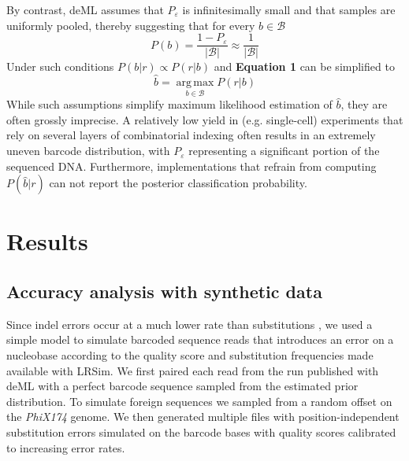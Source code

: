 \documentclass[10pt,twocolumn]{article}
\begin{document}
By contrast, deML \citep{doi:10.1093/bioinformatics/btu719} assumes that $P_{\varepsilon}$ is infinitesimally small and that samples are uniformly pooled, thereby suggesting that for every $b \in \mathcal{B}$
%
\begin{equation}
P(b) = \frac{1 - P_{\varepsilon}}{|\mathcal{B}|} %
\approx \frac{1}{|\mathcal{B}|}
\end{equation}
%
Under such conditions $P(b|r) \propto P(r|b)$ and \textbf{Equation 1} can be simplified to
%
\begin{equation}
\hat{b} = \operatorname*{arg\,max}_{b \in \mathcal{B}} P(r|b)
\end{equation}
%
While such assumptions simplify maximum likelihood estimation of $\hat{b}$, they are often grossly imprecise. A relatively low yield in (e.g. single-cell) experiments that rely on several layers of combinatorial indexing often results in an extremely uneven barcode distribution, with $P_{\varepsilon}$ representing a significant portion of the sequenced DNA. Furthermore, implementations that refrain from computing $P(\hat{b}|r)$ can not report the posterior classification probability.

\section*{Results}

\subsection*{Accuracy analysis with synthetic data}
Since indel errors occur at a much lower rate than substitutions \citep{doi:10.1038/s41598-018-29325-6}, we used a simple model to simulate barcoded sequence reads that introduces an error on a nucleobase according to the quality score and substitution frequencies made available with LRSim\citep{doi:10.1016/j.csbj.2017.10.002}. We first paired each read from the run published with deML with a perfect barcode sequence sampled from the estimated prior distribution. To simulate foreign sequences we sampled from a random offset on the \emph{PhiX174} genome. We then generated multiple files with position-independent substitution errors simulated on the barcode bases with quality scores calibrated to increasing error rates.
\end{document}
